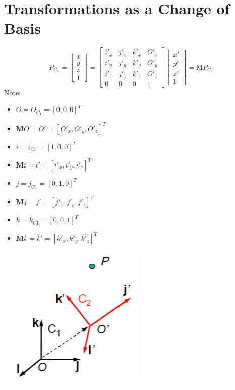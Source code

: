 \documentclass{article}
\begin{document}
\section*{Transformations as a Change of Basis}
\[P_{C_1} = \begin{bmatrix} x \\ y \\ z \\ 1\end{bmatrix} = \begin{bmatrix} i'_x & j'_x & k'_x & O'_x \\ i'_y & j'_y & k'_y & O'_y \\ i'_z & j'_z & k'_z & O'_z \\ 0 & 0 & 0 & 1\end{bmatrix} \begin{bmatrix}x' \\ y' \\ z' \\ 1\end{bmatrix} = \text{M}P_{C_2}\]
Note:
\begin{itemize}
    \item $O = O_{C_1} = [0, 0, 0]^T$
    \item $\textbf{M}O = O' = [O'_x, O'_y, O'_z]^T$
    \item $i = i_{C1} = [1, 0, 0]^T$
    \item $\textbf{M}i = i' = [i'_x, i'_y, i'_z]^T$
    \item $j = j_{C1} = [0, 1, 0]^T$
    \item $\textbf{M}j = j' = [j'_x, j'_y, j'_z]^T$
    \item $k = k_{C1} = [0, 0, 1]^T$
    \item $\textbf{M}k = k' = [k'_x, k'_y, k'_z]^T$   
\end{itemize}
\begin{center}
    \includegraphics*[scale=1]{W2_4.png}
\end{center}
\end{document}

